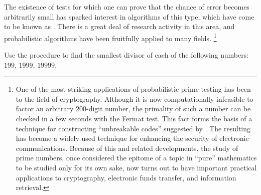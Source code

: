 The existence of tests for which one can prove that the chance of error becomes arbitrarily small has sparked interest in algorithms of this type, which have come to be known as .
There is a great deal of research activity in this area, and probabilistic algorithms have been fruitfully applied to many fields.%
\footnote{
	One of the most striking applications of probabilistic prime testing has been to the field of cryptography.
	Although it is now computationally infeasible to factor an arbitrary 200-digit number, the primality of such a number can be checked in a few seconds with the Fermat test.
	This fact forms the basis of a technique for constructing “unbreakable codes” suggested by .
	The resulting  has become a widely used technique for enhancing the security of electronic communications.
	Because of this and related developments, the study of prime numbers, once considered the epitome of a topic in “pure” mathematics to be studied only for its own sake, now turns out to have important practical applications to cryptography, electronic funds transfer, and information retrieval.
}



\begin{exercise}
	\label{Exercise 1.21}
	Use the  procedure to find the smallest divisor of each of the following numbers:
	\( 199 \), \( 1999 \), \( 19999 \).
\end{exercise}



